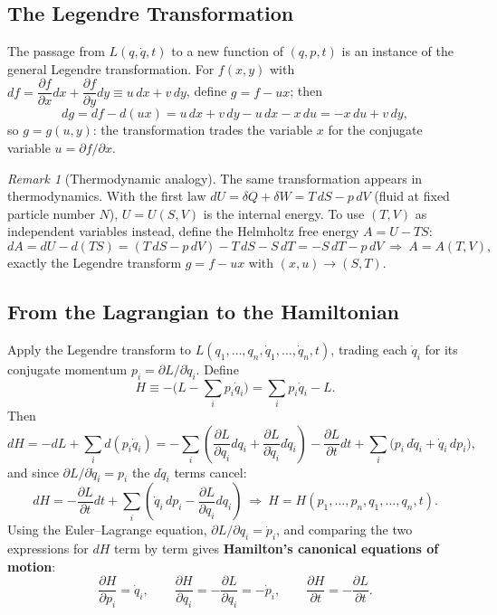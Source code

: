 \documentclass[11pt]{article}
\theoremstyle{remark}
\newtheorem{remark}{Remark}
\begin{document}
\subsection{The Legendre Transformation}

The passage from $L(q,\dot q,t)$ to a new function of $(q,p,t)$ is an instance
of the general Legendre transformation. For $f(x,y)$ with
$df = \dfrac{\partial f}{\partial x}dx + \dfrac{\partial f}{\partial y}dy \equiv u\,dx + v\,dy$,
define $g = f - ux$; then
\[
  dg = df - d(ux) = u\,dx + v\,dy - u\,dx - x\,du = -x\,du + v\,dy,
\]
so $g = g(u,y)$: the transformation trades the variable $x$ for the
conjugate variable $u = \partial f/\partial x$.

\begin{remark}[Thermodynamic analogy]
The same transformation appears in thermodynamics. With the first law
$dU = \delta Q + \delta W = T\,dS - p\,dV$ (fluid at fixed particle number $N$),
$U=U(S,V)$ is the internal energy. To use $(T,V)$ as independent variables
instead, define the Helmholtz free energy $A = U - TS$:
\[
  dA = dU - d(TS) = (T\,dS - p\,dV) - T\,dS - S\,dT = -S\,dT - p\,dV
  \ \Rightarrow\ A = A(T,V),
\]
exactly the Legendre transform $g=f-ux$ with $(x,u)\to(S,T)$.
\end{remark}

\subsection{From the Lagrangian to the Hamiltonian}

Apply the Legendre transform to $L(q_1,\dots,q_n,\dot q_1,\dots,\dot q_n,t)$,
trading each $\dot q_i$ for its conjugate momentum $p_i = \partial L/\partial\dot q_i$.
Define
\[
  H \equiv -\Big(L - \sum_i p_i\dot q_i\Big) = \sum_i p_i \dot q_i - L.
\]
Then
\[
  dH = -dL + \sum_i d(p_i\dot q_i)
  = -\sum_i\left(\frac{\partial L}{\partial q_i}dq_i + \frac{\partial L}{\partial \dot q_i}d\dot q_i\right)
    - \frac{\partial L}{\partial t}dt
    + \sum_i \big(p_i\,d\dot q_i + \dot q_i\,dp_i\big),
\]
and since $\partial L/\partial \dot q_i = p_i$ the $d\dot q_i$ terms cancel:
\[
  dH = -\frac{\partial L}{\partial t}dt + \sum_i\left(\dot q_i\,dp_i - \frac{\partial L}{\partial q_i}dq_i\right)
  \ \Longrightarrow\ H = H(p_1,\dots,p_n,q_1,\dots,q_n,t).
\]
Using the Euler--Lagrange equation, $\partial L/\partial q_i = \dot p_i$, and
comparing the two expressions for $dH$ term by term gives \textbf{Hamilton's
canonical equations of motion}:
\begin{equation}
  \boxed{\ \frac{\partial H}{\partial p_i} = \dot q_i, \qquad
  \frac{\partial H}{\partial q_i} = -\frac{\partial L}{\partial q_i} = -\dot p_i, \qquad
  \frac{\partial H}{\partial t} = -\frac{\partial L}{\partial t}.\ }
  \label{eq:canonical}
\end{equation}
\end{document}
